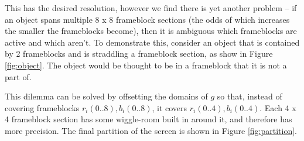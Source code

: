 \documentclass[conference]{IEEEtran}
\begin{document}
This has the desired resolution,
however we find there is yet another problem --
if an object spans multiple 8 x 8 frameblock sections
(the odds of which increases the smaller the frameblocks become),
then it is ambiguous which frameblocks are active and which aren't.
To demonstrate this, consider an object that is contained by 2 frameblocks
and is straddling a frameblock section, as show in Figure \ref{fig:object}.
The object would be thought to be in a frameblock that it is not a part of.
%
%

This dilemma can be solved by offsetting the domains of $g$ so that,
instead of covering frameblocks
$r_i(0..8),b_i(0..8)$,
it covers $r_i(0..4),b_i(0..4)$.
Each 4 x 4 frameblock section has some wiggle-room built in around it,
and therefore has more precision.
The final partition of the screen is shown in Figure \ref{fig:partition}.
\end{document}
